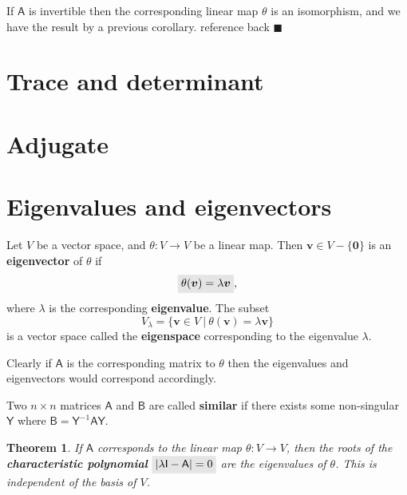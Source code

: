 \documentclass[letter-paper]{tufte-book}
\newtheorem{theorem}{\color{pastel-blue}Theorem}[section]
\newenvironment{proof}[1][Proof]{\begin{trivlist}
\item[\hskip \labelsep {\bfseries #1}]}{\end{trivlist}}
\newcommand{\qed}{\hfill$\blacksquare$}
\newcommand{\highlight}[1]{\mathchoice%
  {\colorbox{black!10}{$\displaystyle#1$}}%
  {\colorbox{black!10}{$\textstyle#1$}}%
  {\colorbox{black!10}{$\scriptstyle#1$}}%
  {\colorbox{black!10}{$\scriptscriptstyle#1$}}}%
\begin{document}
\begin{proof}
  If $\mathsf{A}$ is invertible then the corresponding linear map $\theta$ is an
  isomorphism, and we have the result by a previous corollary. {\color{red}reference back} \qed
\end{proof}


\section{Trace and determinant}


\section{Adjugate}


\section{Eigenvalues and eigenvectors}

Let $V$ be a vector space, and $\theta:V \to V$ be a linear map. Then
$\boldsymbol{v}\in V-\{\boldsymbol{0}\}$ is an \textbf{eigenvector} of $\theta$
if
\begin{equation}
  \highlight{\theta(\boldsymbol{v}) = \lambda \boldsymbol{v}},
\end{equation}
where $\lambda$ is the corresponding \textbf{eigenvalue}. The subset
\begin{equation}
  V_{\lambda} = \{\boldsymbol{v}\in V \ |\ \theta(\boldsymbol{v}) = \lambda \boldsymbol{v}\}
\end{equation}
is a vector space called the \textbf{eigenspace} corresponding to the eigenvalue
$\lambda$.

Clearly if $\mathsf{A}$ is the corresponding matrix to $\theta$ then the
eigenvalues and eigenvectors would correspond accordingly.

Two $n\times n$ matrices $\mathsf{A}$ and $\mathsf{B}$ are called
\textbf{similar} if there exists some non-singular $\mathsf{Y}$ where
$\mathsf{B} = \mathsf{Y}^{-1}\mathsf{AY}$.

\begin{theorem}
  If $\mathsf{A}$ corresponds to the linear map $\theta:V\to V$, then the roots
  of the \textbf{characteristic polynomial} $\highlight{|\lambda\mathsf{I} -
  \mathsf{A}| = 0}$ are the eigenvalues of $\theta$. This is independent of the
  basis of $V$.
\end{theorem}
\end{document}
